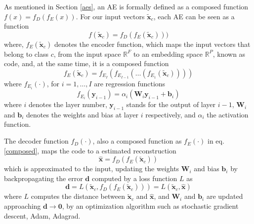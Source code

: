 \documentclass[journal,article,submit,pdftex,moreauthors]{Definitions/mdpi}
\begin{document}
As mentioned in Section \ref{aes}, an AE is formally defined as a composed function $f(x) = f_D(f_E(x))$. For our input vectors $\mathbf{\tilde{x}}_c$, each AE can be seen as a function
\begin{equation}
	f(\mathbf{\tilde{x}}_c) = f_D(f_E(\mathbf{\tilde{x}}_c)))
\end{equation}
where, $f_E(\mathbf{\tilde{x}}_c)$ denotes the encoder function, which maps the input vectors that belong to class $c$, from the input space $\mathbb{R}^F$ to an embedding space $\mathbb{R}^P$, known as code,
and, at the same time, it is a composed function
\begin{equation}
	f_E(\mathbf{\tilde{x}}_c) = f_{E_{I}}(f_{E_{I-1}}(\dots (f_{E_{1}}(\mathbf{\tilde{x}}_c))))
	\label{composed}
\end{equation}
where $f_{E_{i}}(\cdot)$, for $i = 1, \dots, I$ are regression functions
\begin{equation}
	f_{E_{i}}(\mathbf{y}_{i-1}) = \alpha_i(\mathbf{W}_{i}\mathbf{y}_{i-1} + \mathbf{b}_{i})
\end{equation}
where $i$ denotes the layer number, $\mathbf{y}_{i-1}$ stands for the output of layer $i-1$, $\mathbf{W}_{i}$ and $\mathbf{b}_{i}$ denotes the weights and bias at layer $i$ respectively, and $\alpha_i$ the activation function.

The decoder function $f_D(\cdot)$, also a composed function as $f_E(\cdot)$ in eq. \ref{composed}, maps the code to a estimated reconstruction
\begin{equation}
	\mathbf{\hat{x}} = f_{D}(f_E(\mathbf{\mathbf{\tilde{x}}}_c))
\end{equation}
which is approximated to the input, updating the weights $\mathbf{W}_i$ and bias $\mathbf{b}_i$ by backpropagating the error $\mathbf{d}$ computed by a loss function $L$ as
\begin{equation}
	\mathbf{d} = L(\mathbf{\tilde{x}}_c, f_D(f_E(\mathbf{\tilde{x}}_c))) = L(\mathbf{\tilde{x}}_c, \mathbf{\hat{x}})
	\label{loss}
\end{equation}
where $L$ computes the distance between $\mathbf{\tilde{x}}_c$ and $\mathbf{\hat{x}}$, and $\mathbf{W}_i$ and $\mathbf{b}_i$ are updated approaching $\mathbf{d} \to \mathbf{0}$, by an optimization algorithm such as stochastic gradient descent, Adam, Adagrad.
\end{document}
